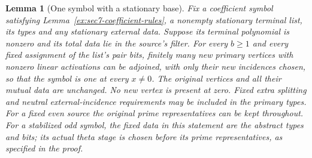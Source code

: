 \documentclass[11pt]{article}
\newtheorem{lemma}[theorem]{Lemma}
\theoremstyle{definition}
\theoremstyle{remark}
\begin{document}
\begin{lemma}[One symbol with a stationary base]\label{ex:sec7-one-symbol-address}
Fix a coefficient symbol satisfying
Lemma~\ref{ex:sec7-coefficient-rules}, a nonempty stationary terminal
list, its types and any stationary external data. Suppose its terminal
polynomial is nonzero and its total data lie in the source's filter.
For every $b\ge1$ and every fixed assignment of the list's pair bits, finitely
many new primary vertices with nonzero linear activations can be
adjoined, with only their new incidences chosen, so that the symbol is
one at every $x\ne0$. The original vertices and all their mutual data
are unchanged. No new vertex is present at zero. Fixed extra splitting
and neutral external-incidence requirements may be included in the
primary types.
For a fixed even source the original prime representatives can be
kept throughout. For a stabilized odd symbol, the fixed data in this
statement are the abstract types and bits; its actual theta stage is
chosen before its prime representatives, as specified in the proof.
\end{lemma}
\end{document}
